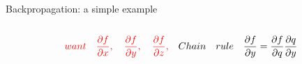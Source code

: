 \documentclass[serif, aspectratio=169]{beamer}
\begin{document}
\begin{frame}{Backpropagation: a simple example}
\begin{columns}
\begin{column}{0.6\textwidth}
\begin{center}
            \end{center}
            
            \[
            \textcolor{red}{ 
            want \quad
            \frac{\partial f}{\partial x}, \quad \frac{\partial f}{\partial y}, \quad
            \frac{\partial f}{\partial z}, \quad
            }
            Chain\quad rule \quad
            \frac{\partial f}{\partial y} =  \frac{\partial f}{\partial q}
            \frac{\partial q}{\partial y}
            \] 
            
        \end{column}

    \end{columns}

\end{frame}
\end{document}
